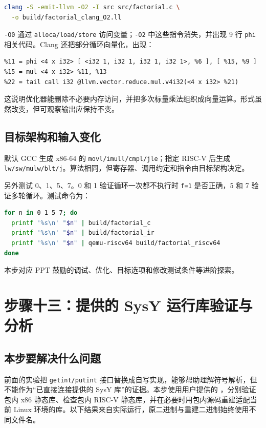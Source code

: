 \documentclass[UTF8,a4paper,12pt]{ctexart}
\begin{document}
\begin{lstlisting}[language=bash]
clang -S -emit-llvm -O2 -I src src/factorial.c \
  -o build/factorial_clang_O2.ll
\end{lstlisting}

\texttt{-O0} 通过 \texttt{alloca/load/store} 访问变量；\texttt{-O2} 中这些指令消失，并出现 9 行 \texttt{phi} 相关代码。Clang 还把部分循环向量化，出现：

\begin{lstlisting}
%11 = phi <4 x i32> [ <i32 1, i32 1, i32 1, i32 1>, %6 ], [ %15, %9 ]
%15 = mul <4 x i32> %11, %13
%22 = tail call i32 @llvm.vector.reduce.mul.v4i32(<4 x i32> %21)
\end{lstlisting}

这说明优化器能删除不必要内存访问，并把多次标量乘法组织成向量运算。形式虽然改变，但可观察输出应保持不变。

\subsection{目标架构和输入变化}

默认 GCC 生成 x86-64 的 \texttt{movl/imull/cmpl/jle}；指定 RISC-V 后生成 \texttt{lw/sw/mulw/blt/j}。算法相同，但寄存器、调用约定和指令由目标架构决定。

另外测试 0、1、5、7。0 和 1 验证循环一次都不执行时 \texttt{f=1} 是否正确，5 和 7 验证多轮循环。测试命令为：

\begin{lstlisting}[language=bash]
for n in 0 1 5 7; do
  printf '%s\n' "$n" | build/factorial_c
  printf '%s\n' "$n" | build/factorial_ir
  printf '%s\n' "$n" | qemu-riscv64 build/factorial_riscv64
done
\end{lstlisting}

本步对应 PPT 鼓励的调试、优化、目标选项和修改测试条件等进阶探索。

\section{步骤十三：提供的 SysY 运行库验证与分析}
\label{sec:provided-runtime}

\subsection{本步要解决什么问题}

前面的实验把 \texttt{getint/putint} 接口替换成自写实现，能够帮助理解符号解析，但不能作为“已直接连接提供的 SysY 库”的证据。本步使用用户提供的 ，分别验证包内 x86 静态库、检查包内 RISC-V 静态库，并在必要时用包内源码重建适配当前 Linux 环境的库。以下结果来自实际运行，原二进制与重建二进制始终使用不同文件名。
\end{document}
